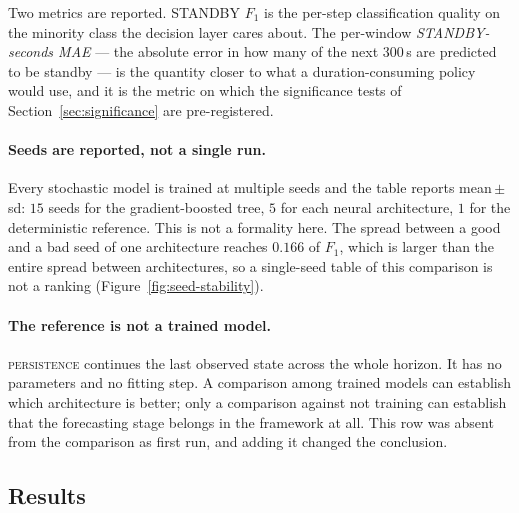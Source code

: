 Two metrics are reported. STANDBY $F_1$ is the per-step classification
quality on the minority class the decision layer cares about. The
per-window \emph{STANDBY-seconds MAE} --- the absolute error in how many
of the next $300$\,s are predicted to be standby --- is the quantity
closer to what a duration-consuming policy would use, and it is the
metric on which the significance tests of
Section~\ref{sec:significance} are pre-registered.

\paragraph{Seeds are reported, not a single run.}
Every stochastic model is trained at multiple seeds and the table
reports mean\,$\pm$\,sd: $15$ seeds for the gradient-boosted tree, $5$
for each neural architecture, $1$ for the deterministic reference. This
is not a formality here. The spread between a good and a bad seed of one
architecture reaches $0.166$ of $F_1$, which is larger than the entire
spread between architectures, so a single-seed table of this comparison
is not a ranking (Figure~\ref{fig:seed-stability}).

\paragraph{The reference is not a trained model.}
\textsc{persistence} continues the last observed state across the whole
horizon. It has no parameters and no fitting step. A comparison among
trained models can establish which architecture is better; only a
comparison against not training can establish that the forecasting stage
belongs in the framework at all. This row was absent from the
comparison as first run, and adding it changed the conclusion.

\subsection{Results}
\label{sec:forecasting:results}

